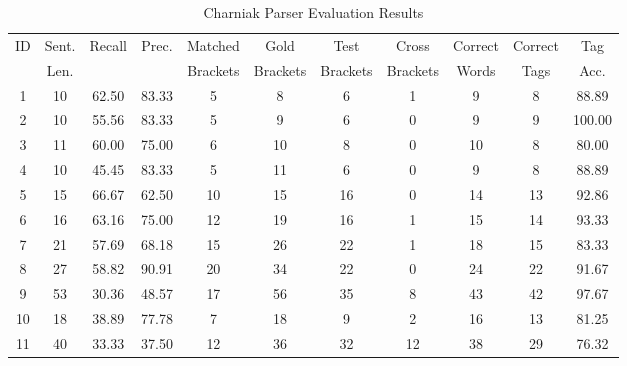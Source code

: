 \begin{table*}[htbp!]
\centering
\begin{tabular}{@{}ccccccccccc@{}}
\toprule
ID & Sent. & Recall & Prec. & Matched & Gold & Test & Cross & Correct & Correct & Tag \\
 & Len. & & & Brackets & Brackets & Brackets & Brackets & Words & Tags & Acc. \\
\midrule
1 & 10 & 62.50 & 83.33 & 5 & 8 & 6 & 1 & 9 & 8 & 88.89 \\
2 & 10 & 55.56 & 83.33 & 5 & 9 & 6 & 0 & 9 & 9 & 100.00 \\
3 & 11 & 60.00 & 75.00 & 6 & 10 & 8 & 0 & 10 & 8 & 80.00 \\
4 & 10 & 45.45 & 83.33 & 5 & 11 & 6 & 0 & 9 & 8 & 88.89 \\
5 & 15 & 66.67 & 62.50 & 10 & 15 & 16 & 0 & 14 & 13 & 92.86 \\
6 & 16 & 63.16 & 75.00 & 12 & 19 & 16 & 1 & 15 & 14 & 93.33 \\
7 & 21 & 57.69 & 68.18 & 15 & 26 & 22 & 1 & 18 & 15 & 83.33 \\
8 & 27 & 58.82 & 90.91 & 20 & 34 & 22 & 0 & 24 & 22 & 91.67 \\
9 & 53 & 30.36 & 48.57 & 17 & 56 & 35 & 8 & 43 & 42 & 97.67 \\
10 & 18 & 38.89 & 77.78 & 7 & 18 & 9 & 2 & 16 & 13 & 81.25 \\
11 & 40 & 33.33 & 37.50 & 12 & 36 & 32 & 12 & 38 & 29 & 76.32 \\
\bottomrule
\end{tabular}
\caption{Charniak Parser Evaluation Results}
\label{tab:parser_eval}
\end{table*}
